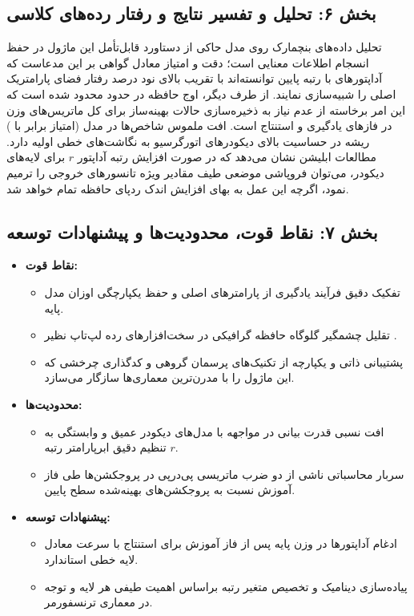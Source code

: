\subsection*{بخش ۶: تحلیل و تفسیر نتایج و رفتار رده‌های کلاسی }
تحلیل داده‌های بنچمارک روی مدل  حاکی از دستاورد قابل‌تأمل این ماژول در حفظ انسجام اطلاعات معنایی است؛ دقت  و امتیاز  معادل  گواهی بر این مدعاست که آداپتورهای با رتبه پایین توانسته‌اند با تقریب بالای نود درصد رفتار فضای پارامتریک اصلی را شبیه‌سازی نمایند. از طرف دیگر، اوج حافظه در حدود  محدود شده است که این امر برخاسته از عدم نیاز به ذخیره‌سازی حالات بهینه‌ساز  برای کل ماتریس‌های وزن در فازهای یادگیری و استنتاج است. 
افت ملموس شاخص‌ها در مدل  (امتیاز  برابر با ) ریشه در حساسیت بالای دیکودرهای اتورگرسیو به نگاشت‌های خطی اولیه دارد. مطالعات ابلیشن  نشان می‌دهد که در صورت افزایش رتبه آداپتور $r$ برای لایه‌های دیکودر، می‌توان فروپاشی موضعی طیف مقادیر ویژه تانسورهای خروجی را ترمیم نمود، اگرچه این عمل به بهای افزایش اندک ردپای حافظه تمام خواهد شد.

\subsection*{بخش ۷: نقاط قوت، محدودیت‌ها و پیشنهادات توسعه }
\begin{itemize}
    \item \textbf{نقاط قوت:}
    \begin{itemize}
        \item تفکیک دقیق فرآیند یادگیری از پارامترهای اصلی و حفظ یکپارچگی اوزان مدل پایه.
        \item تقلیل چشمگیر گلوگاه حافظه گرافیکی در سخت‌افزارهای رده لپ‌تاپ نظیر .
        \item پشتیبانی ذاتی و یکپارچه از تکنیک‌های پرسمان گروهی  و کدگذاری چرخشی  که این ماژول را با مدرن‌ترین معماری‌ها سازگار می‌سازد.
    \end{itemize}
    \item \textbf{محدودیت‌ها:}
    \begin{itemize}
        \item افت نسبی قدرت بیانی در مواجهه با مدل‌های دیکودر عمیق و وابستگی به تنظیم دقیق ابرپارامتر رتبه $r$.
        \item سربار محاسباتی ناشی از دو ضرب ماتریسی پی‌در‌پی در پروجکشن‌ها طی فاز آموزش  نسبت به پروجکشن‌های بهینه‌شده سطح پایین.
    \end{itemize}
    \item \textbf{پیشنهادات توسعه:}
    \begin{itemize}
        \item ادغام آداپتورها در وزن پایه  پس از فاز آموزش برای استنتاج با سرعت معادل لایه خطی استاندارد.
        \item پیاده‌سازی دینامیک و تخصیص متغیر رتبه  براساس اهمیت طیفی هر لایه و توجه در معماری ترنسفورمر.
    \end{itemize}
\end{itemize}

